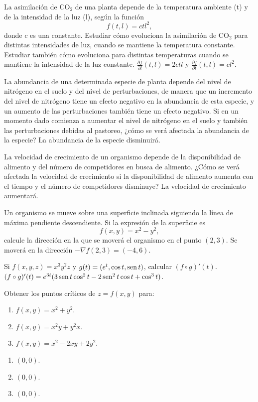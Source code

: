 {La asimilación de CO$_2$ de una planta depende de la temperatura ambiente (t) y de la intensidad de la luz (l), según la función
\[
f(t,l) = ctl^2,
\]
donde $c$ es una constante.
Estudiar cómo evoluciona la asimilación de CO$_2$ para distintas intensidades de luz, cuando se mantiene la temperatura constante.
Estudiar también cómo evoluciona para distintas temperaturas cuando se mantiene la intensidad de la luz constante.
}
{$\frac{\partial f}{\partial l}(t,l) = 2ctl$ y $\frac{\partial f}{\partial t}(t,l) = cl^2$.
}
{
}


{La abundancia de una determinada especie de planta depende del nivel de nitrógeno en el suelo y del nivel de perturbaciones, de manera que un incremento del nivel de nitrógeno tiene un efecto negativo en la abundancia de esta especie, y un aumento de las perturbaciones también tiene un efecto negativo.
Si en un momento dado comienza a aumentar el nivel de nitrógeno en el suelo y también las perturbaciones debidas al pastoreo, ¿cómo se verá afectada la abundancia de la especie?
}
{La abundancia de la especie disminuirá.
}
{
}


{La velocidad de crecimiento de un organismo depende de la disponibilidad de alimento y del número de competidores en busca de alimento.
¿Cómo se verá afectada la velocidad de crecimiento si la disponibilidad de alimento aumenta con el tiempo y el número de competidores disminuye?}
{La velocidad de crecimiento aumentará.
}
{
}


{Un organismo se mueve sobre una superficie inclinada siguiendo la línea de máxima pendiente descendiente.
Si la expresión de la superficie es
\[
f(x,y) = x^2-y^2,
\]
calcule la dirección en la que se moverá el organismo en el punto $(2,3)$.
}
{Se moverá en la dirección $-\nabla f(2,3)=(-4,6)$.}
{
}


{Si $f(x,y,z)=x^3y^2z$ y $g(t)=(e^t,\cos t,\operatorname{sen} t)$, calcular $(f\circ g)'(t)$.
}
{$(f\circ g)'(t)= e^{3t}(3\operatorname{sen} t\cos^2 t-2\operatorname{sen}^2 t\cos t+\cos^3 t)$.
}
{
}


{Obtener los puntos críticos de $z=f(x,y)$ para:
\begin{enumerate}
\item $f(x,y)=x^2+y^2$.
\item $f(x,y)=x^2y+y^2x$.
\item $f(x,y)=x^2-2xy+2y^2$.
\end{enumerate}
}
{\begin{enumerate}
\item $(0,0)$.
\item $(0,0)$.
\item $(0,0)$.
\end{enumerate}
}
{
}


